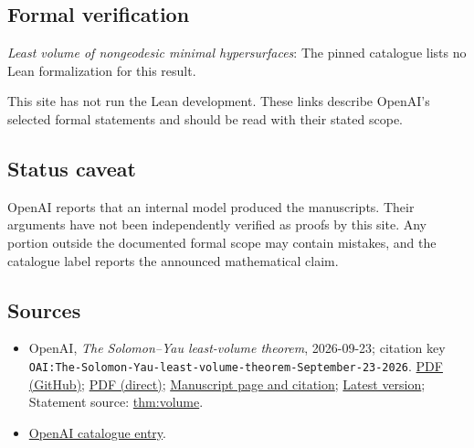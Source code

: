 \documentclass[11pt]{article}
\begin{document}
\subsection{Formal verification}
\textit{Least volume of nongeodesic minimal hypersurfaces}: The pinned catalogue lists no Lean formalization for this result.

This site has not run the Lean development. These links describe OpenAI’s selected formal statements and should be read with their stated scope.

\subsection{Status caveat}
OpenAI reports that an internal model produced the manuscripts. Their arguments have not been independently verified as proofs by this site. Any portion outside the documented formal scope may contain mistakes, and the catalogue label reports the announced mathematical claim.

\subsection{Sources}
\begin{itemize}
\item OpenAI, \emph{The Solomon–Yau least-volume theorem}, 2026-09-23; citation key \texttt{OAI:The-Solomon-Yau-least-volume-theorem-September-23-2026}. \href{https://github.com/openai/math/blob/adc7f1241b42e322a6451854ab7e4b4c146bf78a/preprints/The-Solomon-Yau-least-volume-theorem-September-23-2026/paper.pdf}{PDF (GitHub)}; \href{https://github.com/openai/math/raw/adc7f1241b42e322a6451854ab7e4b4c146bf78a/preprints/The-Solomon-Yau-least-volume-theorem-September-23-2026/paper.pdf}{PDF (direct)}; \href{https://github.com/openai/math/blob/adc7f1241b42e322a6451854ab7e4b4c146bf78a/preprints/The-Solomon-Yau-least-volume-theorem-September-23-2026/README.md}{Manuscript page and citation}; \href{https://github.com/openai/math/blob/main/preprints/The-Solomon-Yau-least-volume-theorem-September-23-2026/paper.pdf}{Latest version}; Statement source: \href{https://github.com/openai/math/blob/adc7f1241b42e322a6451854ab7e4b4c146bf78a/preprints/The-Solomon-Yau-least-volume-theorem-September-23-2026/build/sections/introduction.tex\#L27}{thm:volume}.
\item \href{https://github.com/openai/math/blob/adc7f1241b42e322a6451854ab7e4b4c146bf78a/CONTENTS.md}{OpenAI catalogue entry}.
\end{itemize}
\end{document}
